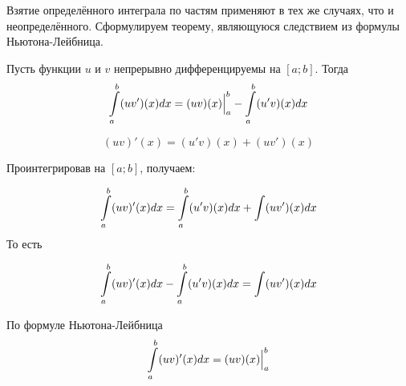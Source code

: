 Взятие определённого интеграла по частям применяют в тех же случаях, что и неопределённого.
Сформулируем теорему, являющуюся следствием из формулы Ньютона-Лейбница.

\begin{teorema}
Пусть функции $u$ и $v$ непрерывно дифференцируемы на $[a;b]$.
Тогда
$$
\int\limits_a^b (uv')(x) dx=(uv)(x)\Bigl.\Bigr|_a^b-\int\limits_a^b(u'v)(x)dx
$$
\end{teorema}

\dokvo
$$
(uv)'(x)=(u'v)(x)+(uv')(x)
$$

Проинтегрировав на $[a;b]$, получаем:

$$
\int\limits_a^b (uv)'(x)dx=\int\limits_a^b (u'v)(x) dx + \int\limits (uv')(x) dx
$$
То есть

$$
\int\limits_a^b (uv)'(x)dx-\int\limits_a^b (u'v)(x) dx = \int\limits (uv')(x) dx
$$


По формуле Ньютона-Лейбница
$$
\int\limits_a^b (uv)'(x)dx = (uv)(x)\Bigl.\Bigr|_a^b
$$

\dokno

